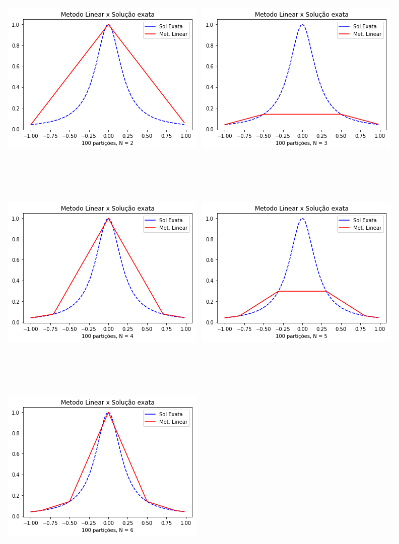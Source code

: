 \documentclass{article}
\begin{document}
\begin{figure}[!htb]
\centering
\includegraphics [width=5cm,height=5cm]{LSEb2.png}
\includegraphics [width=5cm,height=5cm]{LSEb3.png}
\includegraphics [width=5cm,height=5cm]{LSEb4.png}
\includegraphics [width=5cm,height=5cm]{LSEb5.png}
\includegraphics [width=5cm,height=5cm]{LSEb6.png}

\end{figure}
\end{document}
